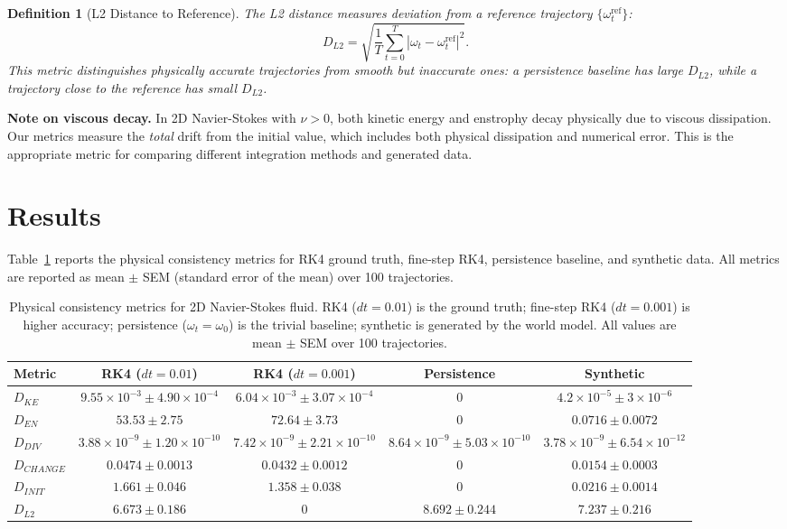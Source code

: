 \documentclass[reprint,aps,pre]{revtex4-2}
\newtheorem{definition}{Definition}
\begin{document}
\begin{definition}[L2 Distance to Reference]
The L2 distance measures deviation from a reference trajectory $\{\omega_t^{\text{ref}}\}$:
\begin{equation}
D_{L2} = \sqrt{\frac{1}{T}\sum_{t=0}^{T} |\omega_t - \omega_t^{\text{ref}}|^2}.
\end{equation}
This metric distinguishes physically accurate trajectories from smooth but inaccurate ones: a persistence baseline has large $D_{L2}$, while a trajectory close to the reference has small $D_{L2}$.
\end{definition}

\textbf{Note on viscous decay.} In 2D Navier-Stokes with $\nu > 0$, both kinetic energy and enstrophy decay physically due to viscous dissipation. Our metrics measure the \textit{total} drift from the initial value, which includes both physical dissipation and numerical error. This is the appropriate metric for comparing different integration methods and generated data.

\section{Results}

Table~\ref{tab:main} reports the physical consistency metrics for RK4 ground truth, fine-step RK4, persistence baseline, and synthetic data. All metrics are reported as mean $\pm$ SEM (standard error of the mean) over 100 trajectories.

\begin{table}[t]
\caption{Physical consistency metrics for 2D Navier-Stokes fluid. RK4 ($dt=0.01$) is the ground truth; fine-step RK4 ($dt=0.001$) is higher accuracy; persistence ($\omega_t=\omega_0$) is the trivial baseline; synthetic is generated by the world model. All values are mean $\pm$ SEM over 100 trajectories.}
\label{tab:main}
\begin{ruledtabular}
\begin{tabular}{lcccc}
Metric & RK4 ($dt=0.01$) & RK4 ($dt=0.001$) & Persistence & Synthetic \\
\hline
$D_{KE}$ & $9.55\times10^{-3} \pm 4.90\times10^{-4}$ & $6.04\times10^{-3} \pm 3.07\times10^{-4}$ & $0$ & $4.2\times10^{-5} \pm 3\times10^{-6}$ \\
$D_{EN}$ & $53.53 \pm 2.75$ & $72.64 \pm 3.73$ & $0$ & $0.0716 \pm 0.0072$ \\
$D_{DIV}$ & $3.88\times10^{-9} \pm 1.20\times10^{-10}$ & $7.42\times10^{-9} \pm 2.21\times10^{-10}$ & $8.64\times10^{-9} \pm 5.03\times10^{-10}$ & $3.78\times10^{-9} \pm 6.54\times10^{-12}$ \\
$D_{CHANGE}$ & $0.0474 \pm 0.0013$ & $0.0432 \pm 0.0012$ & $0$ & $0.0154 \pm 0.0003$ \\
$D_{INIT}$ & $1.661 \pm 0.046$ & $1.358 \pm 0.038$ & $0$ & $0.0216 \pm 0.0014$ \\
$D_{L2}$ & $6.673 \pm 0.186$ & $0$ & $8.692 \pm 0.244$ & $7.237 \pm 0.216$ \\
\end{tabular}
\end{ruledtabular}
\end{table}
\end{document}
